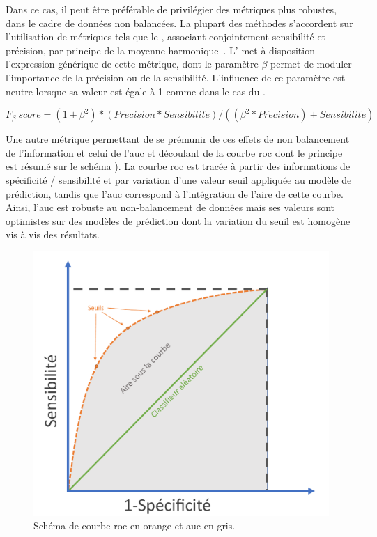 Dans ce cas, il peut être préférable de privilégier des métriques plus robustes, dans le cadre de données non balancées. La plupart des méthodes s’accordent sur l’utilisation de métriques tels que le \fscore{}, associant conjointement sensibilité et précision, par principe de la moyenne harmonique~\cite{Guo2008}. L' met à disposition l'expression générique de cette métrique, dont le paramètre $\beta$ permet de moduler l'importance de la précision ou de la sensibilité. L'influence de ce paramètre est neutre lorsque sa valeur est égale à 1 comme dans le cas du \fscore.\par
 
\begin{equation} 
    {F_\beta \: score}=(1+\beta^2)*(Pr\acute{e}cision*Sensibilit\acute{e})/((\beta^2*Pr\acute{e}cision)+Sensibilit\acute{e})
    \label{eq:metrics_fscore}
\end{equation}
 
Une autre métrique permettant de se prémunir de ces effets de non balancement de l'information et celui de l'\acs{auc} et découlant de la courbe \gls{roc} dont le principe est résumé sur le schéma ). La courbe \gls{roc} est tracée à partir des informations de spécificité / sensibilité et par variation d'une valeur seuil appliquée au modèle de prédiction, tandis que l'\gls{auc} correspond à l'intégration de l'aire de cette courbe. Ainsi, l'\gls{auc} est robuste au non-balancement de données mais ses valeurs sont optimistes sur des modèles de prédiction dont la variation du seuil est homogène vis à vis des résultats.\par

\begin{figure}[H]
    \centering
    \includegraphics[width=0.55\linewidth]{contents/chapter_3/resources/scheme_roc_curve.pdf}
    \caption{Schéma de courbe \gls{roc} en orange et \gls{auc} en gris.}
    \label{fig:scheme_roc_curve}
\end{figure}

